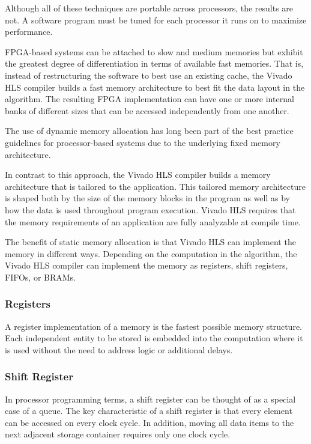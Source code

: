 \begin{highlight}
  Although all of these techniques are portable across processors, the results are not. A
  software program must be tuned for each processor it runs on to maximize performance.
\end{highlight}

\par FPGA-based systems can be attached to slow and medium memories
but exhibit the greatest degree of differentiation in terms of available fast memories. That
is, instead of restructuring the software to best use an existing cache, the Vivado HLS
compiler builds a fast memory architecture to best fit the data layout in the algorithm. The
resulting FPGA implementation can have one or more internal banks of different sizes that
can be accessed independently from one another.

\par The use of dynamic memory allocation has long been part of the best practice guidelines for processor-based systems due to the underlying fixed memory architecture.

\par In contrast to this approach, the Vivado HLS compiler builds a memory architecture that is
tailored to the application. This tailored memory architecture is shaped both by the size of
the memory blocks in the program as well as by how the data is used throughout program
execution. Vivado HLS requires that
the memory requirements of an application are fully analyzable at compile time.

\par The benefit of static memory allocation is that Vivado HLS can implement the memory in different ways. Depending on the computation in the algorithm, the Vivado HLS
compiler can implement the memory as registers, shift registers, FIFOs, or BRAMs.

\subsubsection{Registers}
A register implementation of a memory is the fastest possible memory structure. Each independent entity to be stored is embedded into the computation where it is used without the need to address logic or additional delays.

\subsubsection{Shift Register}
In processor programming terms, a shift register can be thought of as a special case of a queue. The key characteristic of a shift register is that every element can be accessed on every clock cycle. In addition, moving all data items to the next adjacent
storage container requires only one clock cycle.

